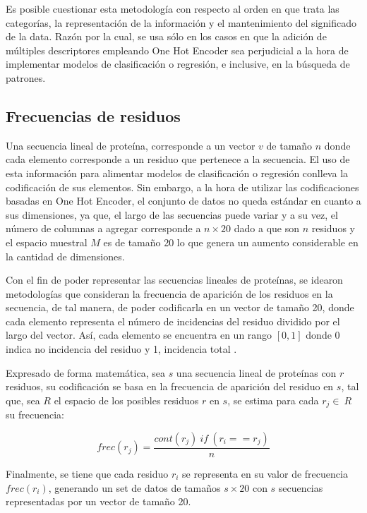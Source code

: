 Es posible cuestionar esta metodología con respecto al orden en que trata las categorías, la representación de la información y el mantenimiento del significado de la data. Razón por la cual, se usa sólo en los casos en que la adición de múltiples descriptores empleando One Hot Encoder sea perjudicial a la hora de implementar modelos de clasificación o regresión, e inclusive, en la búsqueda de patrones.

\subsection{Frecuencias de residuos}

Una secuencia lineal de proteína, corresponde a un vector $v$ de tamaño $n$ donde cada elemento corresponde a un residuo que pertenece a la secuencia. El uso de esta información para alimentar modelos de clasificación o regresión conlleva la codificación de sus elementos. Sin embargo, a la hora de utilizar las codificaciones basadas en One Hot Encoder, el conjunto de datos no queda estándar en cuanto a sus dimensiones, ya que, el largo de las secuencias puede variar y a su vez, el número de columnas a agregar corresponde a $n \times 20$ dado a que son $n$ residuos y el espacio muestral $M$ es de tamaño 20 lo que genera un aumento considerable en la cantidad de dimensiones.

Con el fin de poder representar las secuencias lineales de proteínas, se idearon metodologías que consideran la frecuencia de aparición de los residuos en la secuencia, de tal manera, de poder codificarla en un vector de tamaño 20, donde cada elemento representa el número de incidencias del residuo dividido por el largo del vector. Así, cada elemento se encuentra en un rango $[0,1]$ donde 0 indica no incidencia del residuo y 1, incidencia total \cite{ozbudak2014protein}.

Expresado de forma matemática, sea $s$ una secuencia lineal de proteínas con $r$ residuos, su codificación se basa en la frecuencia de aparición del residuo en $s$, tal que, sea $R$ el espacio de los posibles residuos $r$ en $s$, se estima para cada $r_{j} \in\ R$ su frecuencia:

\begin{equation}
	frec(r_{j}) = \dfrac{cont(r_{j})\ if\  (r_{i}==r_{j})}{n}
\end{equation}

Finalmente, se tiene que cada residuo $r_{i}$ se representa en su valor de frecuencia $frec(r_{i})$, generando un set de datos de tamaños $s \times 20$ con $s$ secuencias representadas por un vector de tamaño 20.

